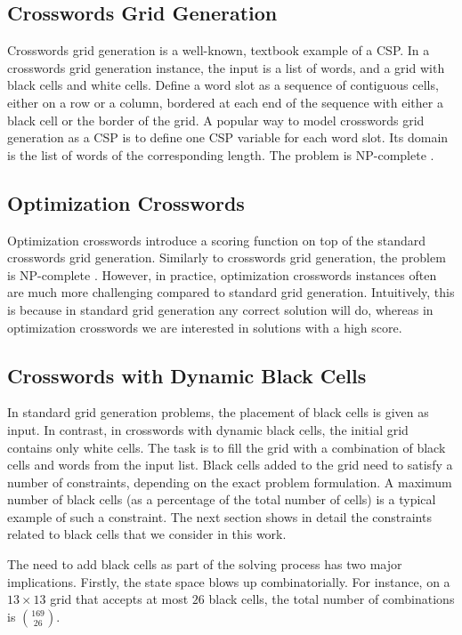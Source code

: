 \subsection{Crosswords Grid Generation}

Crosswords grid generation is a well-known, textbook example of a CSP.
In a crosswords grid generation instance, the input is a list of words, and 
a grid with black cells and white cells.
Define a word slot as a sequence of contiguous cells, either on a row or a column,
bordered at each end of the sequence with either a black cell or the border of the grid.
A popular way to model crosswords grid generation as a CSP is to 
define one CSP variable for each word slot.
Its domain is the list of words of the corresponding length.
The problem is NP-complete \cite{garey1979computers,10.1007/978-3-642-30347-0_15}.

\subsection{Optimization Crosswords}

Optimization crosswords introduce a scoring function on top of the 
standard crosswords grid generation.
Similarly to crosswords grid generation, the problem is NP-complete \cite{DBLP:conf/socs/BoteaB21}.
However, in practice, optimization crosswords instances often are much more
challenging compared to standard grid generation.
Intuitively, this is because in standard grid generation any correct solution will do,
whereas in optimization crosswords we are interested in solutions with a high score.

\subsection{Crosswords with Dynamic Black Cells}

In standard grid generation problems, the placement of black cells is
given as input.
In contrast, in crosswords with dynamic black cells, the initial grid contains 
only white cells. 
The task is to fill the grid with a combination of black cells
and words from the input list.
Black cells added to the grid need to satisfy a number of constraints,
depending on the exact problem formulation.
A maximum number of black cells (as a percentage of the total number of cells)
is a typical example of such a constraint.
The next section shows in detail the constraints related to black cells 
that we consider in this work.

The need to add black cells as part of the solving process has two 
major implications.
Firstly, the state space blows up combinatorially.
For instance, on a $13 \times 13$ grid that accepts at most $26$
black cells, the total number of combinations is $169 \choose 26$.

